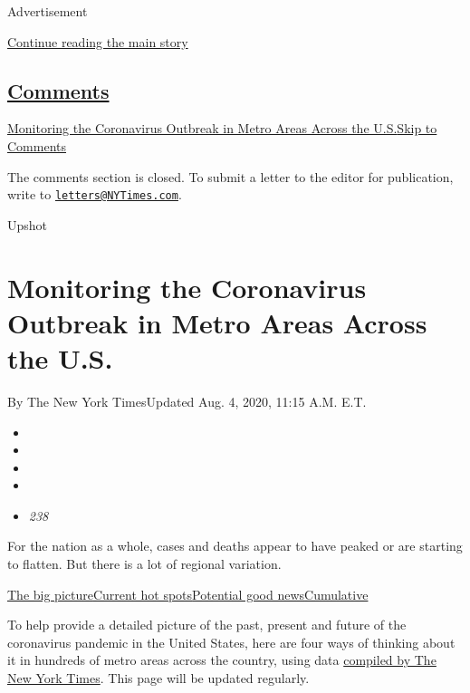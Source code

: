 Advertisement

\protect\hyperlink{after-top}{Continue reading the main story}

\hypertarget{comments}{%
\subsection{\texorpdfstring{\protect\hyperlink{commentsContainer}{Comments}}{Comments}}\label{comments}}

\href{}{Monitoring the Coronavirus Outbreak in Metro Areas Across the
U.S.}\href{}{Skip to Comments}

The comments section is closed. To submit a letter to the editor for
publication, write to
\href{mailto:letters@NYTimes.com}{\nolinkurl{letters@NYTimes.com}}.

Upshot

\hypertarget{monitoring-the-coronavirus-outbreak-in-metro-areas-across-the-us}{%
\section{Monitoring the Coronavirus Outbreak in Metro Areas Across the
U.S.}\label{monitoring-the-coronavirus-outbreak-in-metro-areas-across-the-us}}

By The New York TimesUpdated Aug. 4, 2020, 11:15 A.M. E.T.

\begin{itemize}
\item
\item
\item
\item
\item
  \emph{238}
\end{itemize}

For the nation as a whole, cases and deaths appear to have peaked or are
starting to flatten. But there is a lot of regional variation.

\protect\hyperlink{big-picture}{The big
picture}\protect\hyperlink{hotspots}{Current hot
spots}\protect\hyperlink{good-news}{Potential good
news}\protect\hyperlink{cumulative}{Cumulative}

To help provide a detailed picture of the past, present and future of
the coronavirus pandemic in the United States, here are four ways of
thinking about it in hundreds of metro areas across the country, using
data
\href{https://www.nytimes3xbfgragh.onion/article/coronavirus-county-data-us.html}{compiled
by The New York Times}. This page will be updated regularly.

